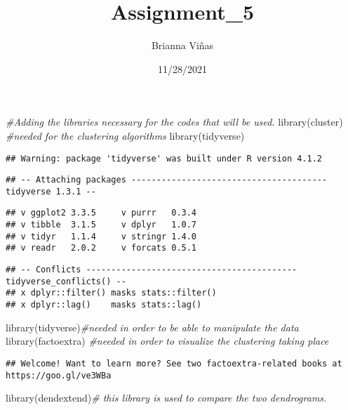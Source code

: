 \documentclass[
]{article}
\title{Assignment\_5}
\author{Brianna Viñas}
\date{11/28/2021}
\newenvironment{Shaded}{\begin{snugshade}}{\end{snugshade}}
\newcommand{\CommentTok}[1]{\textcolor[rgb]{0.56,0.35,0.01}{\textit{#1}}}
\newcommand{\FunctionTok}[1]{\textcolor[rgb]{0.00,0.00,0.00}{#1}}
\newcommand{\NormalTok}[1]{#1}
\begin{document}
\maketitle

\begin{Shaded}
\begin{Highlighting}[]
\CommentTok{\#Adding the libraries necessary for the codes that will be used.}
\FunctionTok{library}\NormalTok{(cluster) }\CommentTok{\#needed for the clustering algorithms }
\FunctionTok{library}\NormalTok{(tidyverse)}
\end{Highlighting}
\end{Shaded}

\begin{verbatim}
## Warning: package 'tidyverse' was built under R version 4.1.2
\end{verbatim}

\begin{verbatim}
## -- Attaching packages --------------------------------------- tidyverse 1.3.1 --
\end{verbatim}

\begin{verbatim}
## v ggplot2 3.3.5     v purrr   0.3.4
## v tibble  3.1.5     v dplyr   1.0.7
## v tidyr   1.1.4     v stringr 1.4.0
## v readr   2.0.2     v forcats 0.5.1
\end{verbatim}

\begin{verbatim}
## -- Conflicts ------------------------------------------ tidyverse_conflicts() --
## x dplyr::filter() masks stats::filter()
## x dplyr::lag()    masks stats::lag()
\end{verbatim}

\begin{Shaded}
\begin{Highlighting}[]
\FunctionTok{library}\NormalTok{(tidyverse)}\CommentTok{\#needed in order to be able to manipulate the data}
\FunctionTok{library}\NormalTok{(factoextra) }\CommentTok{\#needed in order to visualize the clustering taking place}
\end{Highlighting}
\end{Shaded}

\begin{verbatim}
## Welcome! Want to learn more? See two factoextra-related books at https://goo.gl/ve3WBa
\end{verbatim}

\begin{Shaded}
\begin{Highlighting}[]
\FunctionTok{library}\NormalTok{(dendextend)}\CommentTok{\# this library is used to compare the two dendrograms.}
\end{Highlighting}
\end{Shaded}
\end{document}
